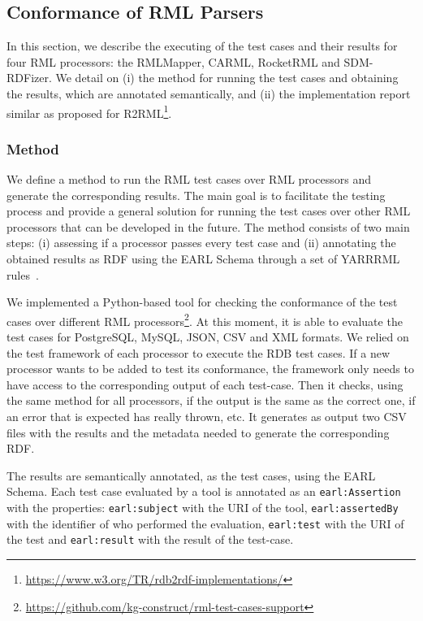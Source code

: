 \subsection{Conformance of RML Parsers}

In this section, we describe the executing of the test cases and their results for four RML processors: the RMLMapper, CARML, RocketRML and SDM-RDFizer. 
We detail on (i) the method for running the test cases and obtaining the results, which are annotated semantically, and (ii) the implementation report similar as proposed for R2RML\footnote{\url{https://www.w3.org/TR/rdb2rdf-implementations/}}. 

\subsubsection{Method}
We define a method to run the RML test cases over RML processors and generate the corresponding results. The main goal is to facilitate the testing process and provide a general solution for running the test cases over other RML processors that can be developed in the future. The method consists of two main steps: (i) assessing if a processor passes every test case and (ii) annotating the obtained results as RDF using the EARL Schema through a set of YARRRML rules~\citep{Heyvaert2018Declarative}.

We implemented a Python-based tool for checking the conformance of the test cases over different RML processors\footnote{\url{https://github.com/kg-construct/rml-test-cases-support}}. At this moment, it is able to evaluate the test cases for PostgreSQL, MySQL, JSON, CSV and XML formats. We relied on the test framework of each processor to execute the RDB test cases. If a new processor wants to be added to test its conformance, the framework only needs to have access to the corresponding output of each test-case. Then it checks, using the same method for all processors, if the output is the same as the correct one, if an error that is expected has really thrown, etc. It generates as output two CSV files with the results and the metadata needed to generate the corresponding RDF.

The results are semantically annotated, as the test cases, using the EARL Schema. Each test case evaluated by a tool is annotated as an \texttt{earl:Assertion} with the properties: \texttt{earl:subject} with the URI of the tool, \texttt{earl:assertedBy} with the identifier of who performed the evaluation, \texttt{earl:test} with the URI of the test and \texttt{earl:result} with the result of the test-case. 

